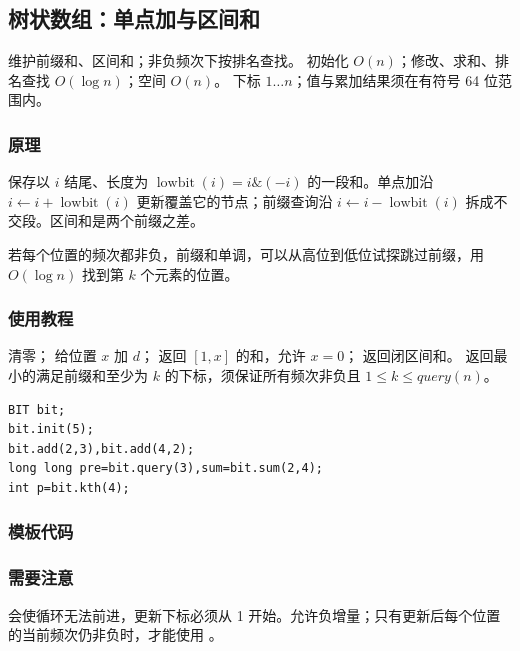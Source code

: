 \subsection{树状数组：单点加与区间和}
\label{ds:bit}
\AlgorithmInfo
    {维护前缀和、区间和；非负频次下按排名查找。}
    {初始化 $O(n)$；修改、求和、排名查找 $O(\log n)$；空间 $O(n)$。}
    {下标 $1\ldots n$；值与累加结果须在有符号 64 位范围内。}
\subsubsection*{原理}
 保存以 $i$ 结尾、长度为 $\operatorname{lowbit}(i)=i\mathbin{\&}(-i)$ 的一段和。单点加沿 $i\gets i+\operatorname{lowbit}(i)$ 更新覆盖它的节点；前缀查询沿 $i\gets i-\operatorname{lowbit}(i)$ 拆成不交段。区间和是两个前缀之差。

若每个位置的频次都非负，前缀和单调，可以从高位到低位试探跳过前缀，用 $O(\log n)$ 找到第 $k$ 个元素的位置。

\subsubsection*{使用教程}
 清零； 给位置 $x$ 加 $d$； 返回 $[1,x]$ 的和，允许 $x=0$； 返回闭区间和。 返回最小的满足前缀和至少为 $k$ 的下标，须保证所有频次非负且 $1\le k\le query(n)$。
\begin{lstlisting}[style=mtycpp,numbers=none]
BIT bit;
bit.init(5);
bit.add(2,3),bit.add(4,2);
long long pre=bit.query(3),sum=bit.sum(2,4);
int p=bit.kth(4);
\end{lstlisting}
\subsubsection*{模板代码}
\subsubsection*{需要注意}
 会使循环无法前进，更新下标必须从 1 开始。允许负增量；只有更新后每个位置的当前频次仍非负时，才能使用 。
